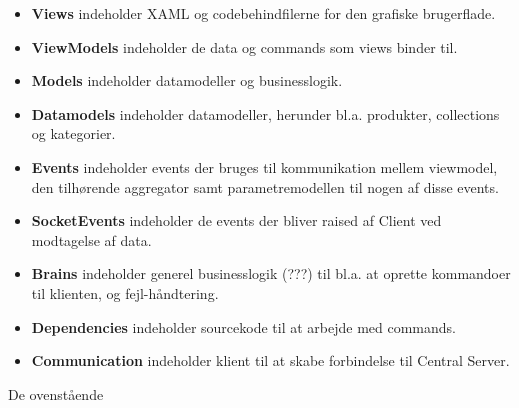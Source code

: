 \begin{itemize}
\item \textbf{Views} indeholder XAML og codebehindfilerne for den grafiske brugerflade. 
\item \textbf{ViewModels} indeholder de data og commands som views binder til. 
\item \textbf{Models} indeholder datamodeller og businesslogik.
\item \textbf{Datamodels} indeholder datamodeller, herunder bl.a. produkter, collections og kategorier.
\item \textbf{Events} indeholder events der bruges til kommunikation mellem viewmodel, den tilhørende aggregator samt parametremodellen til nogen af disse events.
\item \textbf{SocketEvents} indeholder de events der bliver raised af Client ved modtagelse af data.
\item \textbf{Brains} indeholder generel businesslogik (???) til bl.a. at oprette kommandoer til klienten, og fejl-håndtering.
\item \textbf{Dependencies} indeholder sourcekode til at arbejde med commands.
\item \textbf{Communication} indeholder klient til at skabe forbindelse til Central Server.
\end{itemize}

De ovenstående 
